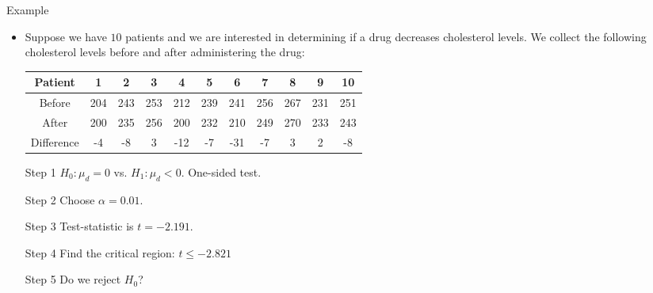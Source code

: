 \documentclass[10pt, handout, xcolor=table]{beamer}
\begin{document}
\begin{frame}{Example}
\begin{itemize}
\setlength{\itemsep}{12pt}
\item Suppose we have $10$ patients and we are interested in determining if a drug decreases cholesterol levels. We collect the following cholesterol levels before and after administering the drug:
{\scriptsize 
\begin{table}[]
\begin{tabular}{|c|c|c|c|c|c|c|c|c|c|c|}
\hline
Patient    & 1   & 2   & 3   & 4   & 5   & 6   & 7   & 8   & 9   & 10  \\ \hline
Before     & 204 & 243 & 253 & 212 & 239 & 241 & 256 & 267 & 231 & 251 \\ \hline
After      & 200 & 235 & 256 & 200 & 232 & 210 & 249 & 270 & 233 & 243 \\ \hline
Difference & -4  & -8  & 3   & -12 & -7  & -31 & -7  & 3   & 2   & -8  \\ \hline
\end{tabular}
\end{table}
}
\item[Step 1] $H_0: \mu_d = 0$ vs. $H_1: \mu_d < 0$. One-sided test.       
\item[Step 2] Choose $\alpha = 0.01$. 
\item[Step 3] Test-statistic is $t = -2.191$.
\item[Step 4] Find the critical region: $t \leq -2.821$
\item[Step 5] Do we reject $H_0$? 
\end{itemize}
\end{frame}
\end{document}
